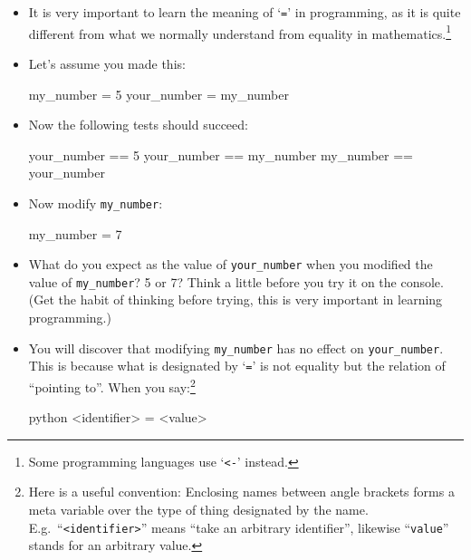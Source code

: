 \documentclass[a4paper]{article}
\begin{document}
\begin{itemize}
\item It is very important to learn the meaning of `\Verb+=+' in programming, as
it is quite different from what we normally understand from equality in
mathematics.\footnote{Some programming languages use `\Verb+<-+' instead.}

\item Let's assume you made this:  

\begin{ucodeframe}
\begin{pyconsole}
my_number = 5
your_number = my_number 
\end{pyconsole}
\end{ucodeframe}

\item Now the following tests should succeed: 

\begin{ucodeframe}
\begin{pyconsole}
your_number == 5 
your_number == my_number 
my_number == your_number 
\end{pyconsole}
\end{ucodeframe}

\item Now modify \Verb+my_number+:

\begin{ucodeframe}
\begin{pyconsole}
my_number = 7 
\end{pyconsole}
\end{ucodeframe}

\item What do you expect as the value of \Verb+your_number+ when you modified
the value of \Verb+my_number+? 5 or 7? Think a little before you try it on the
console. (Get the habit of thinking before trying, this is very important in
learning programming.)

\item You will discover that modifying \Verb+my_number+ has no effect on
\Verb+your_number+. This is because what is designated by `\Verb+=+' is not
equality but the relation of ``pointing to''. When you say:\footnote{Here is a
useful convention: Enclosing names between angle brackets forms a meta variable
over the type of thing designated by the name. E.g.\ ``\Verb+<identifier>+''
means ``take an arbitrary identifier'', likewise ``\Verb+value+'' stands for an
arbitrary value.}

\begin{pygments}[frame=single]{python}
<identifier> = <value>
\end{pygments}


\end{itemize}
\end{document}
